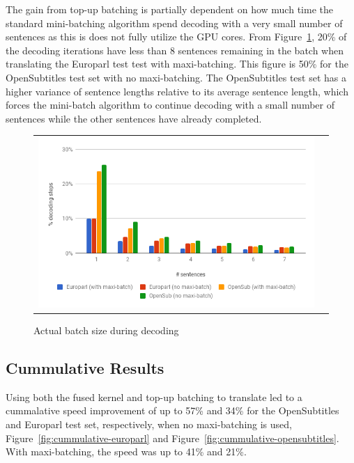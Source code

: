 \documentclass[11pt,a4paper]{article}
\begin{document}
The gain from top-up batching is partially dependent on how much time the standard mini-batching algorithm spend decoding with a very small number of sentences as this is does not fully utilize the GPU cores. From Figure~\ref{fig:batch-size-small}, 20\% of the decoding iterations have less than 8 sentences remaining in the batch when translating the Europarl test test with maxi-batching. This figure is 50\% for the OpenSubtitles test set with no maxi-batching. The OpenSubtitles test set has a higher variance of sentence lengths relative to its average sentence length, which forces the mini-batch algorithm to continue decoding with a small number of sentences while the other sentences have already completed.

\begin{figure}
\centering
\begin{tabular}{cc}
{\includegraphics[scale=0.3]{batch-size-small.png}} 
\end{tabular}
\caption{Actual batch size during decoding}
\label{fig:batch-size-small}
\end{figure} 

\subsection{Cummulative Results}

Using both the fused kernel and top-up batching to translate led to a cummalative speed improvement of up to 57\% and 34\% for the OpenSubtitles and Europarl test set, respectively, when no maxi-batching is used, Figure~\ref{fig:cummulative-europarl} and Figure~\ref{fig:cummulative-opensubtitles}. With maxi-batching, the speed was up to 41\% and 21\%.
\end{document}
